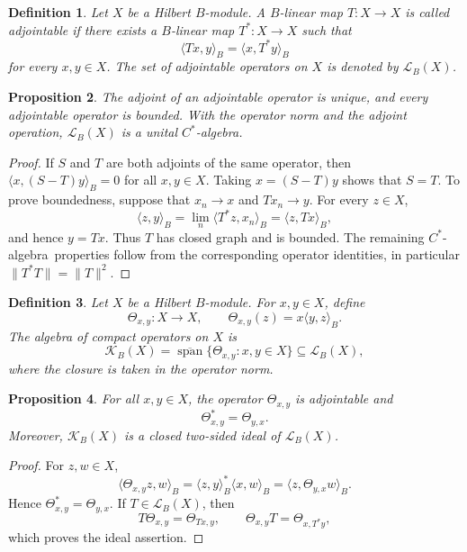 \documentclass{book}
\newtheorem{definition}{Definition}[section]
\newtheorem{proposition}[definition]{Proposition}
\def\cstar{\(C^*\)-algebra}
\begin{document}
\begin{definition}
  Let \(X\) be a Hilbert \(B\)-module. A \(B\)-linear map \(T:X\to X\)
  is called \textnormal{adjointable} if there exists a \(B\)-linear map
  \(T^*:X\to X\) such that
  \[
    \langle Tx,y\rangle_B
    =
    \langle x,T^*y\rangle_B
  \]
  for every \(x,y\in X\). The set of adjointable operators on \(X\) is
  denoted by \(\mathcal L_B(X)\).
\end{definition}
\begin{proposition}
  The adjoint of an adjointable operator is unique, and every adjointable
  operator is bounded. With the operator norm and the adjoint operation,
  \(\mathcal L_B(X)\) is a unital \cstar.
\end{proposition}
\begin{proof}
  If \(S\) and \(T\) are both adjoints of the same operator, then
  \(\langle x,(S-T)y\rangle_B=0\) for all \(x,y\in X\). Taking
  \(x=(S-T)y\) shows that \(S=T\). To prove boundedness, suppose that
  \(x_n\to x\) and \(Tx_n\to y\). For every \(z\in X\),
  \[
    \langle z,y\rangle_B
    =
    \lim_n\langle T^*z,x_n\rangle_B
    =
    \langle z,Tx\rangle_B,
  \]
  and hence \(y=Tx\). Thus \(T\) has closed graph and is bounded. The
  remaining \cstar\ properties follow from the corresponding operator
  identities, in particular \(\|T^*T\|=\|T\|^2\).
\end{proof}
\begin{definition}
  Let \(X\) be a Hilbert \(B\)-module. For \(x,y\in X\), define
  \[
    \Theta_{x,y}:X\longrightarrow X,
    \qquad
    \Theta_{x,y}(z)=x\langle y,z\rangle_B.
  \]
  The algebra of \textnormal{compact operators} on \(X\) is
  \[
    \mathcal K_B(X)
    =
    \overline{\operatorname{span}}
    \{\Theta_{x,y}:x,y\in X\}
    \subseteq\mathcal L_B(X),
  \]
  where the closure is taken in the operator norm.
\end{definition}
\begin{proposition}
  For all \(x,y\in X\), the operator \(\Theta_{x,y}\) is adjointable and
  \[
    \Theta_{x,y}^*=\Theta_{y,x}.
  \]
  Moreover, \(\mathcal K_B(X)\) is a closed two-sided ideal of
  \(\mathcal L_B(X)\).
\end{proposition}
\begin{proof}
  For \(z,w\in X\),
  \[
    \langle\Theta_{x,y}z,w\rangle_B
    =
    \langle z,y\rangle_B^*\langle x,w\rangle_B
    =
    \langle z,\Theta_{y,x}w\rangle_B.
  \]
  Hence \(\Theta_{x,y}^*=\Theta_{y,x}\). If
  \(T\in\mathcal L_B(X)\), then
  \[
    T\Theta_{x,y}=\Theta_{Tx,y},
    \qquad
    \Theta_{x,y}T=\Theta_{x,T^*y},
  \]
  which proves the ideal assertion.
\end{proof}
\end{document}
